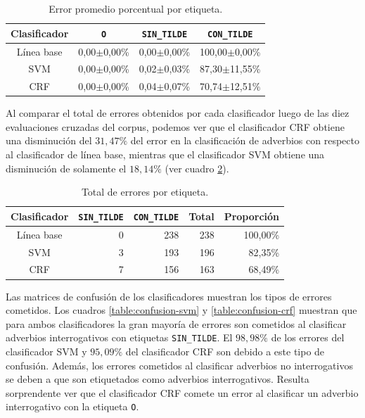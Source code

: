 \documentclass[runningheads,a4paper]{llncs}
\begin{document}
\begin{table}[ht]
 	\renewcommand{\arraystretch}{1.3}
	\renewcommand{\tabcolsep}{3pt}
	\caption{Error promedio porcentual por etiqueta.}
	\label{table:evaluacion-promedio}
	\centering
	\begin{tabular}{c r r r}
		\hline\hline
		\multicolumn{1}{c}{\textbf{Clasificador}} 
			& \multicolumn{1}{c}{\textbf{\texttt{O}}}
			& \multicolumn{1}{c}{\textbf{\texttt{SIN\_TILDE}}}
			& \multicolumn{1}{c}{\textbf{\texttt{CON\_TILDE}}} \\
		\hline
		Línea base & 0,00$\pm$0,00\% & 0,00$\pm$0,00\% & 100,00$\pm$0,00\% \\
		SVM        & 0,00$\pm$0,00\% & 0,02$\pm$0,03\% &  87,30$\pm$11,55\% \\
		CRF        & 0,00$\pm$0,00\% & 0,04$\pm$0,07\% &  70,74$\pm$12,51\% \\
		\hline
	\end{tabular}
\end{table}

Al comparar el total de errores obtenidos por cada clasificador luego de las diez  evaluaciones cruzadas del corpus, podemos ver que el clasificador CRF obtiene una disminución del $31,47\%$ del error en la clasificación de adverbios con respecto al clasificador de línea base, mientras que el clasificador SVM obtiene una disminución de solamente el $18,14\%$ (ver cuadro \ref{table:evaluacion-total}).

\begin{table}[ht]
 	\renewcommand{\arraystretch}{1.3}
	\renewcommand{\tabcolsep}{3pt}
	\caption{Total de errores por etiqueta.}
	\label{table:evaluacion-total}
	\centering
	\begin{tabular}{c r r r r}
		\hline\hline
		\multicolumn{1}{c}{\textbf{Clasificador}} 
			& \multicolumn{1}{c}{\textbf{\texttt{SIN\_TILDE}}}
			& \multicolumn{1}{c}{\textbf{\texttt{CON\_TILDE}}} 
			& \multicolumn{1}{c}{\textbf{Total}} 
			& \multicolumn{1}{c}{\textbf{Proporci\'on}} \\
		\hline
		Línea base 	& 0 & 238 & 238 & 100,00\% \\
		SVM 		& 3 & 193 & 196 &  82,35\% \\
		CRF 		& 7 & 156 & 163 &  68,49\% \\
		\hline
	\end{tabular}
\end{table}

Las matrices de confusi\'on de los clasificadores muestran los tipos de errores cometidos. Los cuadros \ref{table:confusion-svm} y \ref{table:confusion-crf} muestran que para ambos clasificadores la gran mayor\'ia de errores son cometidos al clasificar adverbios interrogativos con etiquetas \texttt{\small SIN\_TILDE}. El $98,98\%$ de los errores del clasificador SVM y $95,09\%$ del clasificador CRF son debido a este tipo de confusi\'on. Además, los errores cometidos al clasificar adverbios no interrogativos se deben a que son etiquetados como adverbios interrogativos. Resulta sorprendente ver que el clasificador CRF comete un error al clasificar un adverbio interrogativo con la etiqueta \texttt{\small O}.
\end{document}
